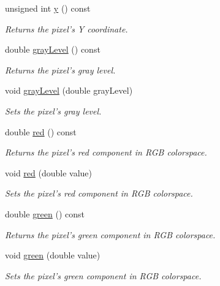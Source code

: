 \begin{CompactItemize}
unsigned int \hyperlink{class_pixel_204cc91a99e1e4f1d96c9cf6caf5747a}{y} () const 
\begin{CompactList}\small\item\em Returns the pixel's Y coordinate. \item\end{CompactList}\item 
double \hyperlink{class_pixel_6e445cee8bfa4475238823e0b6da42b0}{grayLevel} () const 
\begin{CompactList}\small\item\em Returns the pixel's gray level. \item\end{CompactList}\item 
void \hyperlink{class_pixel_03f96954bfc27f8f8810e8c6e58828f8}{grayLevel} (double grayLevel)
\begin{CompactList}\small\item\em Sets the pixel's gray level. \item\end{CompactList}\item 
double \hyperlink{class_pixel_52542702e90cafc9c29713c23cd35e8f}{red} () const 
\begin{CompactList}\small\item\em Returns the pixel's red component in RGB colorspace. \item\end{CompactList}\item 
void \hyperlink{class_pixel_cc64470d744c5fc5b26cedb027366b5d}{red} (double value)
\begin{CompactList}\small\item\em Sets the pixel's red component in RGB colorspace. \item\end{CompactList}\item 
double \hyperlink{class_pixel_71606a21fe4efc55a5ce5bb318b629f7}{green} () const 
\begin{CompactList}\small\item\em Returns the pixel's green component in RGB colorspace. \item\end{CompactList}\item 
void \hyperlink{class_pixel_98aaded2bc7bf4708edaaf2445acae0f}{green} (double value)
\begin{CompactList}\small\item\em Sets the pixel's green component in RGB colorspace. \item\end{CompactList}\item 

\end{CompactItemize}
